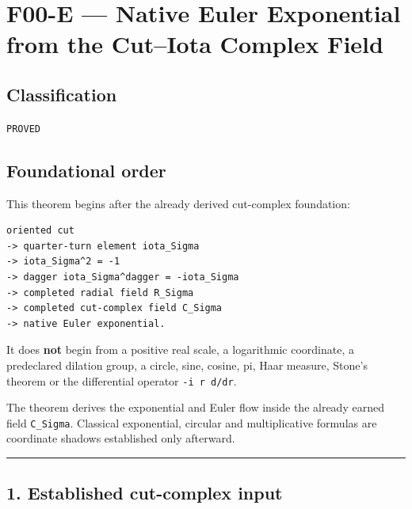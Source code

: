 \hypertarget{f00-e-native-euler-exponential-from-the-cutiota-complex-field}{%
\chapter{F00-E --- Native Euler Exponential from the Cut--Iota Complex Field}\label{f00-e-native-euler-exponential-from-the-cutiota-complex-field}}

\hypertarget{classification}{%
\section{Classification}\label{classification}}

\texttt{PROVED}

\hypertarget{foundational-order}{%
\section{Foundational order}\label{foundational-order}}

This theorem begins after the already derived cut-complex foundation:

\begin{verbatim}
oriented cut
-> quarter-turn element iota_Sigma
-> iota_Sigma^2 = -1
-> dagger iota_Sigma^dagger = -iota_Sigma
-> completed radial field R_Sigma
-> completed cut-complex field C_Sigma
-> native Euler exponential.
\end{verbatim}

It does \textbf{not} begin from a positive real scale, a logarithmic coordinate, a
predeclared dilation group, a circle, sine, cosine, pi, Haar measure, Stone's
theorem or the differential operator \texttt{-i\ r\ d/dr}.

The theorem derives the exponential and Euler flow inside the already earned
field \texttt{C\_Sigma}. Classical exponential, circular and multiplicative formulas
are coordinate shadows established only afterward.

\begin{center}\rule{0.5\linewidth}{0.5pt}\end{center}

\hypertarget{established-cut-complex-input}{%
\section{1. Established cut-complex input}\label{established-cut-complex-input}}

